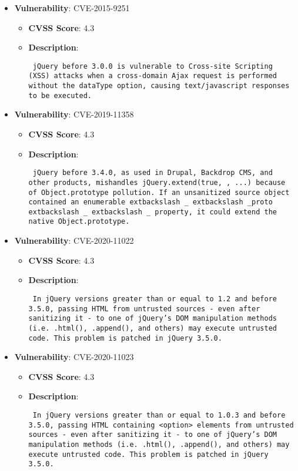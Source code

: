 \documentclass{article}
\begin{document}
\begin{itemize}
    
        \item \textbf{Vulnerability}: CVE-2015-9251
        \begin{itemize}
            \item \textbf{CVSS Score}:  4.3 
            \item \textbf{Description}: \parbox{\linewidth}{\texttt{ jQuery before 3.0.0 is vulnerable to Cross-site Scripting (XSS) attacks when a cross-domain Ajax request is performed without the dataType option, causing text/javascript responses to be executed. }}
        \end{itemize}
    
        \item \textbf{Vulnerability}: CVE-2019-11358
        \begin{itemize}
            \item \textbf{CVSS Score}:  4.3 
            \item \textbf{Description}: \parbox{\linewidth}{\texttt{ jQuery before 3.4.0, as used in Drupal, Backdrop CMS, and other products, mishandles jQuery.extend(true, {}, ...) because of Object.prototype pollution. If an unsanitized source object contained an enumerable 	extbackslash _	extbackslash _proto	extbackslash _	extbackslash _ property, it could extend the native Object.prototype. }}
        \end{itemize}
    
        \item \textbf{Vulnerability}: CVE-2020-11022
        \begin{itemize}
            \item \textbf{CVSS Score}:  4.3 
            \item \textbf{Description}: \parbox{\linewidth}{\texttt{ In jQuery versions greater than or equal to 1.2 and before 3.5.0, passing HTML from untrusted sources - even after sanitizing it - to one of jQuery's DOM manipulation methods (i.e. .html(), .append(), and others) may execute untrusted code. This problem is patched in jQuery 3.5.0. }}
        \end{itemize}
    
        \item \textbf{Vulnerability}: CVE-2020-11023
        \begin{itemize}
            \item \textbf{CVSS Score}:  4.3 
            \item \textbf{Description}: \parbox{\linewidth}{\texttt{ In jQuery versions greater than or equal to 1.0.3 and before 3.5.0, passing HTML containing <option> elements from untrusted sources - even after sanitizing it - to one of jQuery's DOM manipulation methods (i.e. .html(), .append(), and others) may execute untrusted code. This problem is patched in jQuery 3.5.0. }}
        \end{itemize}
    
\end{itemize}
\end{document}
